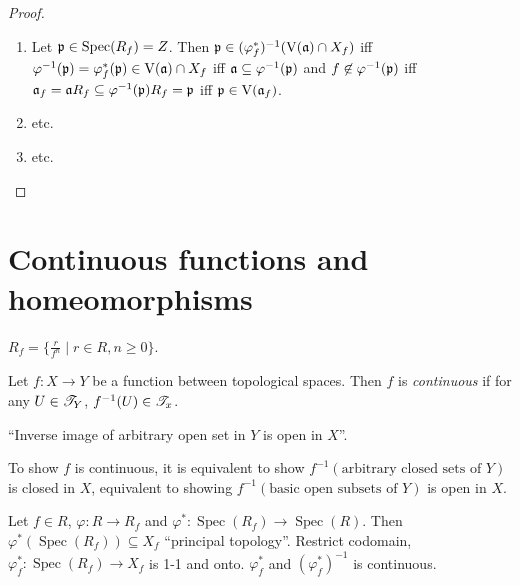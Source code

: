 \begin{proof}
    \begin{enumerate}
        \item Let $\mathfrak{p} \in \operatorname{Spec}(R_f) = Z$. Then $\mathfrak{p} \in (\varphi_f^*)^{-1}(\operatorname{V}(\mathfrak{a}) \cap X_f)$ iff $\varphi^{-1}(\mathfrak{p}) = \varphi_f^*(\mathfrak{p}) \in \operatorname{V}(\mathfrak{a}) \cap X_f$ iff $\mathfrak{a} \subseteq \varphi^{-1}(\mathfrak{p})$ and $f \not \in \varphi^{-1}(\mathfrak{p})$ iff $\mathfrak{a}_f = \mathfrak{a} R_f \subseteq \varphi^{-1}(\mathfrak{p})R_f = \mathfrak{p}$ iff $\mathfrak{p} \in \operatorname{V}(\mathfrak{a}_f)$.
        \item etc.
        \item etc. \qedhere
    \end{enumerate}
\end{proof}

\section{Continuous functions and homeomorphisms}

$R_f = \{\frac{r}{f^n} \mid r \in R, n \geq 0\}$.

\begin{definition}
    Let $f: X \to Y$ be a function between topological spaces. Then $f$ is \emph{continuous} if for any $U \in \mathscr{T}_Y$, $f^{-1}(U) \in \mathscr{T}_x$. \par 
    ``Inverse image of arbitrary open set in $Y$ is open in $X$''. 
\end{definition}

\begin{fact}
    To show $f$ is continuous, it is equivalent to show $f^{-1}(\text{arbitrary closed sets of $Y$})$ is closed in $X$, equivalent to showing $f^{-1}(\text{basic open subsets of $Y$})$ is open in $X$.
\end{fact}

\begin{theorem}
    Let $f \in R$, $\varphi: R \to R_f$ and $\varphi^*: \operatorname{Spec}(R_f) \to \operatorname{Spec}(R)$. Then  $\varphi^*(\operatorname{Spec}(R_f)) \subseteq X_f$ ``principal topology''. Restrict codomain, $\varphi_f^*: \operatorname{Spec}(R_f) \to X_f$ is 1-1 and onto. $\varphi_f^*$ and $(\varphi_f^*)^{-1}$ is continuous. 
\end{theorem}

